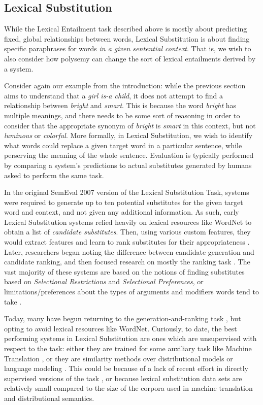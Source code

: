 \documentclass[letterpaper]{article}
\begin{document}
\subsection{Lexical Substitution}
\label{sec:lexsub}

While the Lexical Entailment task described above is mostly about predicting
fixed, global relationships between words, Lexical Substitution is about
finding specific paraphrases for words {\em in a given sentential context}.
That is, we wish to also consider how polysemy can change the sort of
lexical entailments derived by a system.

Consider again our example from the introduction: while the previous section
aims to understand that a {\em girl is-a child}, it does not attempt to find a
relationship between {\em bright} and {\em smart}. This is because the word
{\em bright} has multiple meanings, and there needs to be some sort of
reasoning in order to consider that the appropriate synonym of {\em bright}
is {\em smart} in this context, but not {\em luminous} or {\em colorful}.
More formally, in Lexical Substitution, we wish to identify what
words could replace a given target word in a particular sentence, while
perserving the meaning of the whole sentence. Evaluation is typically
performed by comparing a system's predictions to actual substitutes generated
by humans asked to perform the same task.

In the original SemEval 2007 version of the Lexical Substitution Task, systems
were required to generate up to ten potential substitutes for the given target
word and context, and not given any additional information. As such, early
Lexical Substitution systems relied heavily on lexical resources like WordNet
to obtain a list of {\em candidate substitutes}. Then, using various custom
features, they would extract features and learn to rank substitutes for their
appropriateness \cite{mccarthy:2007:semeval}. Later, researchers began noting
the difference between candidate generation and candidate ranking, and then
focused research on mostly the ranking task \cite{NEEDCITE}. The vast majority
of these systems are based on the notions of finding substitutes based on {\em
Selectional Restrictions} and {\em Selectional Preferences}, or
limitations/preferences about the types of arguments and modifiers words tend
to take \cite{NEEDCITE}.

Today, many have begun returning to the generation-and-ranking task
\cite{kawakami:2015:arxiv,melamud:2015:naacl,roller:2016:naacl}, but opting to
avoid lexical resources like WordNet.  Curiously, to date, the best performing
systems in Lexical Substitution are ones which are unsupervised with respect to
the task: either they are trained for some auxiliary task like Machine
Translation \cite{kawakami:2015:arxiv}, or they are similarity methods over
distributional models \cite{roller:2016:naacl} or language modeling
\cite{melamud:2015:naacl}. This could be because of a lack of recent effort in
directly supervised versions of the task \cite{szarvas:2013:naacl}, or because
lexical substitution data sets are relatively small compared to the size of the
corpora used in machine translation and distributional semantics.
\end{document}
